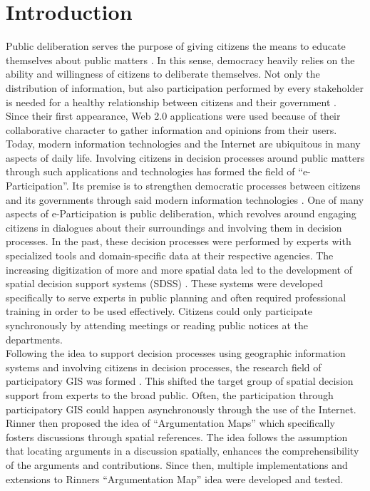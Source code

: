 \section{Introduction}
\label{chap:introduction}
Public deliberation serves the purpose of giving citizens the means to educate themselves about public matters \cite{page1996deliberates}. In this sense, democracy heavily relies on the ability and willingness of citizens to deliberate themselves. Not only the distribution of information, but also participation performed by every stakeholder is needed for a healthy relationship between citizens and their government \cite{Arnstein1969_citizen_participation}.\\
Since their first appearance, Web 2.0 applications were used because of their collaborative character to gather information and opinions from their users. Today, modern information technologies and the Internet are ubiquitous in many aspects of daily life. Involving citizens in decision processes around public matters through such applications and technologies has formed the field of ``e-Participation''. Its premise is to strengthen democratic processes between citizens and its governments through said modern information technologies \cite{Saebo_eParticipation, Medaglia2012_eParticipation}. One of many aspects of e-Participation is public deliberation, which revolves around engaging citizens in dialogues about their surroundings and involving them in decision processes. In the past, these decision processes were performed by experts with specialized tools and domain-specific data at their respective agencies. The increasing digitization of more and more spatial data led to the development of spatial decision support systems (SDSS) \cite{densham_sdss}. These systems were developed specifically to serve experts in public planning and often required professional training in order to be used effectively. Citizens could only participate synchronously by attending meetings or reading public notices at the departments.\\
Following the idea to support decision processes using geographic information systems and involving citizens in decision processes, the research field of participatory GIS was formed \cite{Macintosh2004_eParticipation_characterization,Sieber2006_PublicParticipationGIS}. This shifted the target group of spatial decision support from experts to the broad public. Often, the participation through participatory GIS could happen asynchronously through the use of the Internet. Rinner then proposed the idea of ``Argumentation Maps'' \cite{Rinner_ArgumentationMaps} which specifically fosters discussions through spatial references. The idea follows the assumption that locating arguments in a discussion spatially, enhances the comprehensibility of the arguments and contributions. Since then, multiple implementations and extensions to Rinners ``Argumentation Map'' idea were developed and tested.\\

